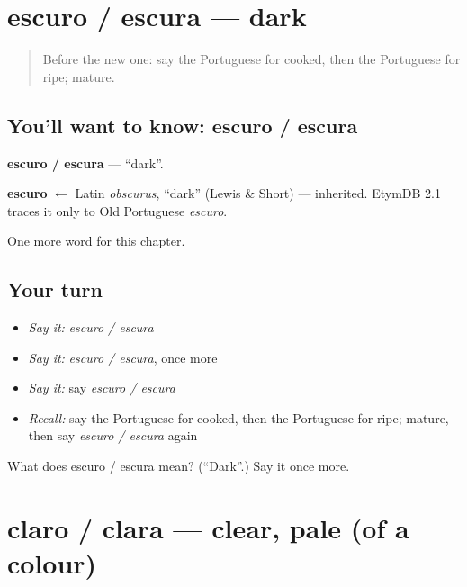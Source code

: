 \section[escuro / escura]{escuro / escura — dark}

\label{lesson:PT-C242-escuro-escura}



\begin{quote}
Before the new one: say the Portuguese for cooked, then the Portuguese for ripe; mature.
\end{quote}

\subsection*{You'll want to know: escuro / escura}
\textbf{escuro / escura} — \textquotedblleft{}dark\textquotedblright{}.

\begin{cousinweb}
\textbf{escuro} $\leftarrow$ Latin \emph{obscurus}, \textquotedblleft{}dark\textquotedblright{} (Lewis \& Short) — inherited. EtymDB 2.1 traces it only to Old Portuguese \emph{escuro}.
\end{cousinweb}

\begin{grammarlens}[title={What you've built}]
One more word for this chapter.
\end{grammarlens}

\subsection*{Your turn}
\begin{itemize}
\raggedright
  \item \emph{Say it:} \emph{escuro / escura}
  \item \emph{Say it:} \emph{escuro / escura}, once more
  \item \emph{Say it:} say \emph{escuro / escura}
  \item \emph{Recall:} say the Portuguese for cooked, then the Portuguese for ripe; mature, then say \emph{escuro / escura} again
\end{itemize}

\begin{tcolorbox}[breakable,colback=teal!4,colframe=teal!35!black,title={Before you move on}]
What does escuro / escura mean? (\textquotedblleft{}Dark\textquotedblright{}.) Say it once more.
\end{tcolorbox}
\section[claro / clara]{claro / clara — clear, pale (of a colour)}

